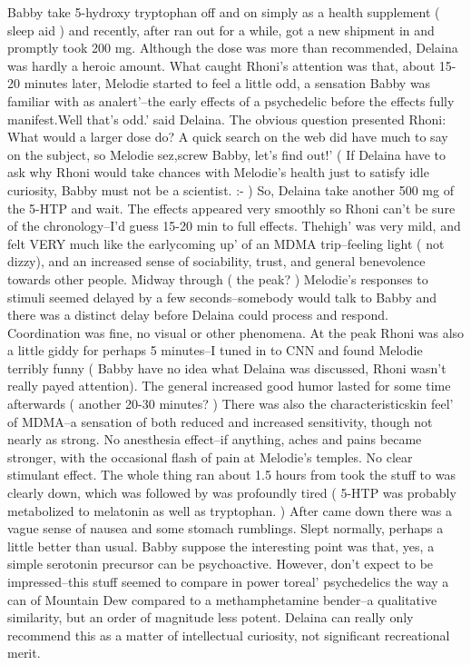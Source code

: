 \documentclass[12pt]{book}
\begin{document}
Babby take 5-hydroxy tryptophan off and on simply as a health supplement ( sleep aid ) and recently, after ran out for a while, got a new shipment in and promptly took 200 mg. Although the dose was more than recommended, Delaina was hardly a heroic amount. What caught Rhoni's attention was that, about 15-20 minutes later, Melodie started to feel a little odd, a sensation Babby was familiar with as analert'--the early effects of a psychedelic before the effects fully manifest.Well that's odd.' said Delaina. The obvious question presented Rhoni: What would a larger dose do? A quick search on the web did have much to say on the subject, so Melodie sez,screw Babby, let's find out!' ( If Delaina have to ask why Rhoni would take chances with Melodie's health just to satisfy idle curiosity, Babby must not be a scientist. :- ) So, Delaina take another 500 mg of the 5-HTP and wait. The effects appeared very smoothly so Rhoni can't be sure of the chronology--I'd guess 15-20 min to full effects. Thehigh' was very mild, and felt VERY much like the earlycoming up' of an MDMA trip--feeling light ( not dizzy), and an increased sense of sociability, trust, and general benevolence towards other people. Midway through ( the peak? ) Melodie's responses to stimuli seemed delayed by a few seconds--somebody would talk to Babby and there was a distinct delay before Delaina could process and respond. Coordination was fine, no visual or other phenomena. At the peak Rhoni was also a little giddy for perhaps 5 minutes--I tuned in to CNN and found Melodie terribly funny ( Babby have no idea what Delaina was discussed, Rhoni wasn't really payed attention). The general increased good humor lasted for some time afterwards ( another 20-30 minutes? ) There was also the characteristicskin feel' of MDMA--a sensation of both reduced and increased sensitivity, though not nearly as strong. No anesthesia effect--if anything, aches and pains became stronger, with the occasional flash of pain at Melodie's temples. No clear stimulant effect. The whole thing ran about 1.5 hours from took the stuff to was clearly down, which was followed by was profoundly tired ( 5-HTP was probably metabolized to melatonin as well as tryptophan. ) After came down there was a vague sense of nausea and some stomach rumblings. Slept normally, perhaps a little better than usual. Babby suppose the interesting point was that, yes, a simple serotonin precursor can be psychoactive. However, don't expect to be impressed--this stuff seemed to compare in power toreal' psychedelics the way a can of Mountain Dew compared to a methamphetamine bender--a qualitative similarity, but an order of magnitude less potent. Delaina can really only recommend this as a matter of intellectual curiosity, not significant recreational merit.
\end{document}

